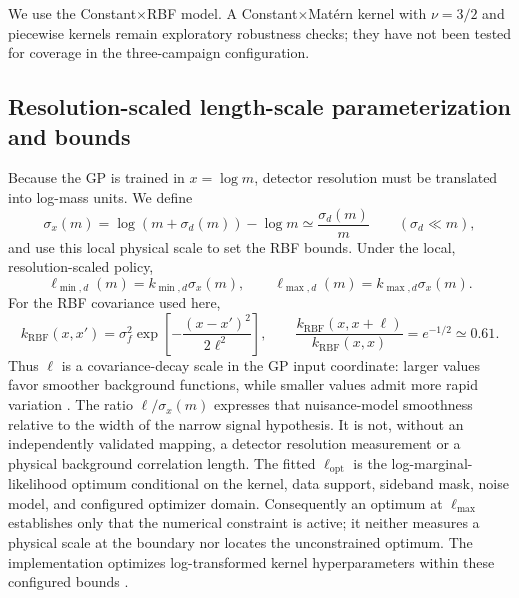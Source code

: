 We use the Constant$\times$RBF model. A Constant$\times$Mat\'ern kernel with
$\nu=3/2$ and piecewise kernels remain exploratory robustness checks; they have not
been tested for coverage in the three-campaign configuration.

\subsection{Resolution-scaled length-scale parameterization and bounds}
\label{sec:length-scale}

Because the GP is trained in $x=\log m$, detector resolution must be translated into
log-mass units. We define
\begin{equation}
\sigma_x(m) = \log\!\left(m+\sigma_d(m)\right) - \log m
\simeq \frac{\sigma_d(m)}{m}
\qquad (\sigma_d \ll m),
\end{equation}
and use this local physical scale to set the RBF bounds. Under the local,
resolution-scaled policy,
\begin{equation}
\ell_{\min,d}(m) = k_{\min,d}\sigma_x(m),
\qquad
\ell_{\max,d}(m) = k_{\max,d}\sigma_x(m).
\label{eq:dataset-lengthscale-bounds}
\end{equation}
For the RBF covariance used here,
\begin{equation}
k_{\mathrm{RBF}}(x,x') =
\sigma_f^2\exp\!\left[-\frac{(x-x')^2}{2\ell^2}\right],
\qquad
\frac{k_{\mathrm{RBF}}(x,x+\ell)}{k_{\mathrm{RBF}}(x,x)}
=e^{-1/2}\simeq0.61 .
\label{eq:rbf-lengthscale-interpretation}
\end{equation}
Thus $\ell$ is a covariance-decay scale in the GP input coordinate: larger values
favor smoother background functions, while smaller values admit more rapid
variation \cite{RasmussenWilliams2006,FrateGP2017}. The ratio
$\ell/\sigma_x(m)$ expresses that nuisance-model smoothness relative to the width of
the narrow signal hypothesis. It is not, without an independently validated mapping,
a detector resolution measurement or a physical background correlation length.
The fitted $\ell_{\mathrm{opt}}$ is the log-marginal-likelihood optimum conditional
on the kernel, data support, sideband mask, noise model, and configured optimizer
domain. Consequently an optimum at $\ell_{\max}$ establishes only that the numerical
constraint is active; it neither measures a physical scale at the boundary nor
locates the unconstrained optimum. The implementation optimizes log-transformed
kernel hyperparameters within these configured bounds
\cite{ScikitLearnGPRDocs16}.

